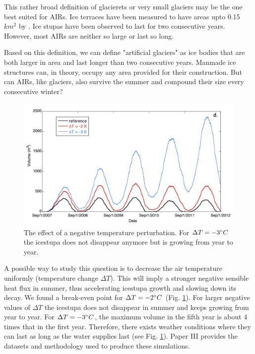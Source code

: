 This rather broad definition of glacierets or very small glaciers may be the one best suited for AIRs. Ice
terraces have been measured to have areas upto 0.15 $km^2$ by
\citet{nusserSociohydrologyArtificialGlaciers2019}. Ice stupas have been observed to last for two consecutive
years. However, most AIRs are neither so large or last so long.

Based on this definition, we can define "artificial glaciers" as ice bodies that are both larger in area and
last longer than two consecutive years. Manmade ice structures can, in theory, occupy any area provided for
their construction. But can AIRs, like glaciers, also survive the summer and compound their size every
consecutive winter? 

\begin{figure}[htb]
  \centering
	\includegraphics[width=12 cm]{figs/PIR_example.png}
  \caption{The effect of a negative temperature perturbation. For $\Delta T = -3 ^{\circ} C$ the icestupa does
  not disappear anymore but is growing from year to year.}
\label{fig:PIR}
\end{figure}

A possible way to study this question is to decrease the air temperature uniformly (temperature change $\Delta
T$). This will imply a stronger negative sensible heat flux in summer, thus accelerating icestupa growth and
slowing down its decay. We found a break-even point for $\Delta T = -2 ^{\circ} C$ (Fig. \ref{fig:PIR}). For
larger negative values of $\Delta T$ the icestupa does not disappear in summer and keeps growing from year to
year. For $\Delta T = -3 ^{\circ} C$, the maximum volume in the fifth year is about 4 times that in the first
year. Therefore, there exists weather conditions where they can last as long as the water supplies last (see
Fig. \ref{fig:PIR}). Paper III provides the datasets and methodology used to produce these simulations.



